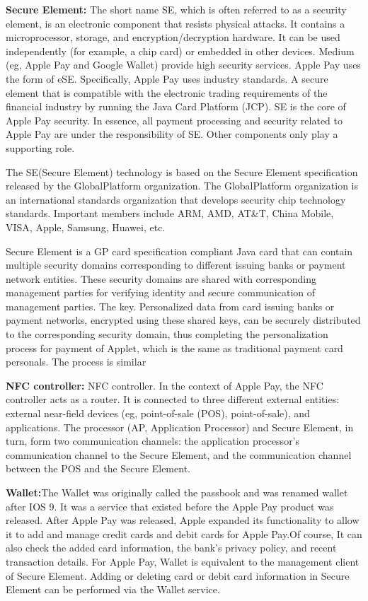 \documentclass[journal]{IEEEtran}
\begin{document}
\textbf{Secure Element:} The short name SE, which is often referred to as a security element, is an electronic component that resists physical attacks. It contains a microprocessor, storage, and encryption/decryption hardware. It can be used independently (for example, a chip card) or embedded in other devices. Medium (eg, Apple Pay and Google Wallet) provide high security services. Apple Pay uses the form of eSE. Specifically, Apple Pay uses industry standards. A secure element that is compatible with the electronic trading requirements of the financial industry by running the Java Card Platform (JCP). SE is the core of Apple Pay security. In essence, all payment processing and security related to Apple Pay are under the responsibility of SE. Other components only play a supporting role.

The SE(Secure Element) technology is based on the Secure Element specification released by the GlobalPlatform organization. The GlobalPlatform organization is an international standards organization that develops security chip technology standards. Important members include ARM, AMD, AT\&T, China Mobile, VISA, Apple, Samsung, Huawei, etc.

Secure Element is a GP card specification compliant Java card that can contain multiple security domains corresponding to different issuing banks or payment network entities. These security domains are shared with corresponding management parties for verifying identity and secure communication of management parties. The key. Personalized data from card issuing banks or payment networks, encrypted using these shared keys, can be securely distributed to the corresponding security domain, thus completing the personalization process for payment of Applet, which is the same as traditional payment card personals. The process is similar
    
    \textbf{NFC controller:} NFC controller. In the context of Apple Pay, the NFC controller acts as a router. It is connected to three different external entities: external near-field devices (eg, point-of-sale (POS), point-of-sale), and applications. The processor (AP, Application Processor) and Secure Element, in turn, form two communication channels: the application processor's communication channel to the Secure Element, and the communication channel between the POS and the Secure Element.
    
    \textbf{Wallet:}The Wallet was originally called the passbook and was renamed wallet after IOS 9. It was a service that existed before the Apple Pay product was released. After Apple Pay was released, Apple expanded its functionality to allow it to add and manage credit cards and debit cards for Apple Pay.Of course, It can also check the added card information, the bank's privacy policy, and recent transaction details. For Apple Pay, Wallet is equivalent to the management client of Secure Element. Adding or deleting card or debit card information in Secure Element can be performed via the Wallet service.
   
\end{document}
